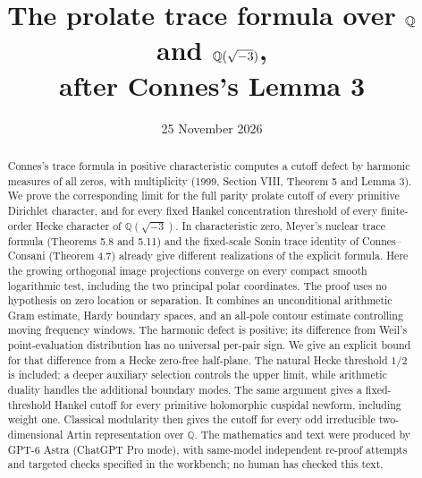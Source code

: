 \documentclass[11pt,a4paper]{article}
\title{The prolate trace formula over $\Q$ and $\Q(\sqrt{-3})$,\\after Connes's Lemma 3}
\author{}
\date{25 November 2026}
\theoremstyle{definition}\newtheorem{definition}[theorem]{Definition}
\theoremstyle{remark}\newtheorem{remark}[theorem]{Remark}
\newcommand{\Q}{\mathbb Q}\newcommand{\Z}{\mathbb Z}
\begin{document}
\maketitle
\begin{abstract}
Connes's trace formula in positive characteristic computes a cutoff
 defect by harmonic measures of all zeros, with multiplicity
(1999, Section VIII, Theorem 5 and Lemma 3). We prove the corresponding
limit for the full parity prolate cutoff of every primitive Dirichlet
character, and for every fixed Hankel concentration threshold of every
finite-order Hecke character of $\Q(\sqrt{-3})$. In characteristic zero,
Meyer's nuclear trace formula (Theorems 5.8 and 5.11) and the fixed-scale
Sonin trace identity of Connes--Consani (Theorem 4.7) already give
different realizations of the explicit formula. Here the growing
orthogonal image projections converge on every compact smooth
logarithmic test, including the two principal polar coordinates.
The proof uses no hypothesis on zero location or separation.
It combines an unconditional arithmetic Gram estimate, Hardy boundary
spaces, and an all-pole contour estimate controlling moving frequency
windows. The harmonic defect is positive; its difference from Weil's
point-evaluation distribution has no universal per-pair sign. We give
an explicit bound for that difference from a Hecke zero-free half-plane.
The natural Hecke threshold $1/2$ is included; a deeper auxiliary
selection controls the upper limit, while arithmetic duality handles
the additional boundary modes.
The same argument gives a fixed-threshold Hankel cutoff for every
primitive holomorphic cuspidal newform, including weight one.
Classical modularity then gives the cutoff for every odd irreducible
two-dimensional Artin representation over $\Q$.
The mathematics and text were produced by GPT-6 Astra (ChatGPT Pro mode),
with same-model independent re-proof attempts and targeted checks specified in
the workbench; no human has checked this text.
\end{abstract}














\end{document}
